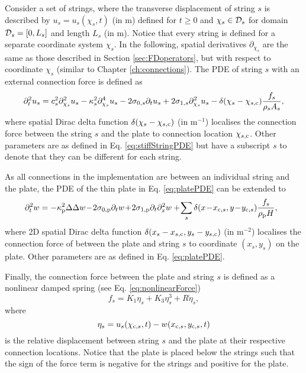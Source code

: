 Consider a set of strings, where the transverse displacement of string $s$ is described by $u_s = u_s(\chi_s, t)$ (in m) defined for $t\geq 0$ and $\chi_s \in \mathcal{D}_s$ for domain $\mathcal{D}_s = [0, L_s]$ and length $L_s$ (in m). Notice that every string is defined for a separate coordinate system $\chi_s$. In the following, spatial derivatives $\partial_{\chi_s}$ are the same as those described in Section \ref{sec:FDoperators}, but with respect to coordinate $\chi_s$ (similar to Chapter \ref{ch:connections}). The PDE of string $s$ with an external connection force is defined as %
\begin{equation}
    \ptt u_s = c_s^2 \partial_{\chi_s}^2 u_s - \kappa_s^2 \partial_{\chi_s}^4 u_s - 2 \szX[s]\pt u_s + 2 \soX[s] \partial_{\chi_s}^2 u_s - \delta(\chi_s - \chi_{s, \ctxt})\frac{f_s}{\rho_sA_s},
\end{equation}
where spatial Dirac delta function $\delta(\chi_s - \chi_{s,\text{c}})$ (in m$^{-1}$) localises the connection force between the string $s$ and the plate to connection location $\chi_{s, \text{c}}$. Other parameters are as defined in Eq. \eqref{eq:stiffStringPDE} but have a subscript $s$ to denote that they can be different for each string. 

As all connections in the implementation are between an individual string and the plate, the PDE of the thin plate in Eq. \eqref{eq:platePDE} can be extended to 
\begin{equation}
    \begin{aligned}
    \!\!\!\!\ptt w = -\kappa_\ptxt^2\Delta\Delta w &\!-\! 2\szX[\ptxt]\pt w\! +\! 2\soX[\ptxt] \pt\pxx w+ \!\sum_s\delta(x \!-\! x_{\ctxt,s}, y \!-\! y_{\ctxt,s})\frac{f_s}{\rho_\ptxt H},\!\!\!\!\!\!
    \end{aligned}
\end{equation}
where 2D spatial Dirac delta function $\delta(x_s - x_{s,\text{c}}, y_s - y_{s,\text{c}})$ (in m$^{-2}$) localises the connection force of between the plate and string $s$ to coordinate $(x_s, y_s)$ on the plate. Other parameters are as defined in Eq. \eqref{eq:platePDE}. 

Finally, the connection force between the plate and string $s$ is defined as a nonlinear damped spring (see Eq. \eqref{eq:nonlinearForce})
\begin{equation}
    f_s = K_1\eta_s + K_3\eta_s^3 + R \dot \eta_s,
\end{equation}
where
\begin{equation}
    \eta_s = u_s(\chi_{\text{c},s}, t) - w(x_{\text{c},s}, y_{\text{c},s}, t)
\end{equation}
is the relative displacement between string $s$ and the plate at their respective connection locations. Notice that the plate is placed below the strings such that the sign of the force term is negative for the strings and positive for the plate.

